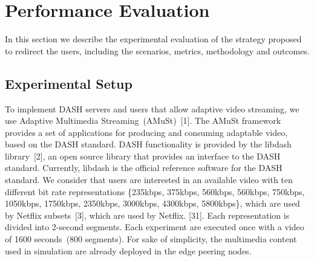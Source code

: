 \section{Performance Evaluation}
\label{sec:results}

In this section we describe the experimental evaluation of the strategy proposed to redirect the users, including the scenarios, metrics, methodology and outcomes.
 
%

\subsection{Experimental Setup}


To implement DASH servers and users that allow adaptive video streaming, we use Adaptive Multimedia Streaming~(AMuSt)~[1]. The AMuSt framework provides a set of applications for producing and consuming adaptable video, based on the DASH standard. DASH functionality is provided by the libdash library~[2], an open source library that provides an interface to the DASH standard. Currently, libdash is the official reference software for the DASH standard. We consider that users are interested in an available video with ten different bit rate representations \{235kbps, 375kbps, 560kbps, 560kbps, 750kbps, 1050kbps, 1750kbps, 2350kbps, 3000kbps, 4300kbps, 5800kbps\}, which are used by Netflix subsets~[3], which are used by Netflix. [31]. Each representation is divided into 2-second segments. Each experiment are executed once with a video of 1600 seconds~(800 segments). 
For sake of simplicity, the multimedia content used in simulation are already deployed in the edge peering nodes. 

